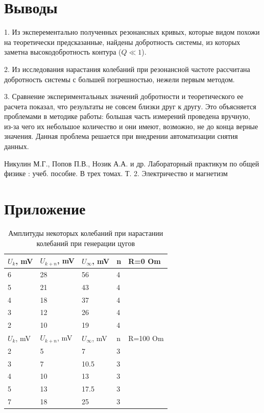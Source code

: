 \documentclass[a4paper,12pt]{article} %
\begin{document}
\section{Выводы}

\hspace{5mm}1. Из эксперементально полученных резонансных кривых, которые видом похожи на теоретически предсказанные, найдены добротность системы, из которых заметна высокодобротность контура ($Q\ll 1$).

2. Из исследования нарастания колебаний при резонансной частоте рассчитана добротность системы с большей погрешностью, нежели первым методом.

3. Сравнение экспериментальных значений добротности и теоретического ее расчета показал, что результаты не совсем близки друг к другу. Это объясняется проблемами в методике работы: большая часть измерений проведена вручную, из-за чего их небольшое количество и они имеют, возможно, не до конца верные значения. Данная проблема решается при внедрении автоматизации снятия данных.



\begin{thebibliography}{}
      Никулин М.Г., Попов П.В., Нозик А.А. и др. Лабораторный практикум по общей физике : учеб. пособие. В трех томах. Т. 2. Электричество и магнетизм
\end{thebibliography}


\section*{Приложение}
\begin{table}[h!]
\caption{Амплитуды некоторых колебаний при нарастании колебаний при генерации цугов}
\label{нарост}
\begin{tabular}{|l|l|l|l|l|}
\hline
$U_k$, mV & $U_{k+n}$, mV & $U_\infty$, mV & n & R=0 Om   \\ \hline
6         & 28            & 56             & 4 &          \\ \hline
5         & 21            & 43             & 4 &          \\ \hline
4         & 18            & 37             & 4 &          \\ \hline
3         & 12            & 26             & 4 &          \\ \hline
2         & 10            & 19             & 4 &          \\ \hline
$U_k$, mV & $U_{k+n}$, mV & $U_\infty$, mV & n & R=100 Om \\ \hline
2         & 5             & 7              & 3 &          \\ \hline
3         & 7             & 10.5           & 3 &          \\ \hline
4         & 10            & 13             & 3 &          \\ \hline
5         & 13            & 17.5           & 3 &          \\ \hline
7         & 18            & 25             & 3 &          \\ \hline
\end{tabular}
\end{table}
\end{document}
